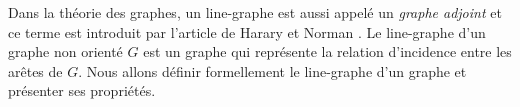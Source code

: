 Dans la th\'eorie des graphes, un line-graphe est aussi appel\'e un {\em graphe adjoint} et ce terme est introduit par l'article de Harary et Norman \cite{harary1960some}.
Le line-graphe d'un graphe non orient\'e $G$ est un graphe qui repr\'esente la relation d'incidence entre les ar\^etes de $G$.
Nous allons d\'efinir formellement le line-graphe d'un graphe et pr\'esenter ses propri\'et\'es.
